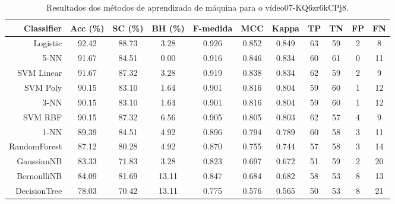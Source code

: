 \begin{table}[!htb]
\centering
\caption{Resultados dos métodos de aprendizado de máquina para o vídeo07-KQ6zr6kCPj8.}
\label{tab:07-KQ6zr6kCPj8}
\begin{tabular}{r|c|c|c|c|c|c|c|c|c|c}
\hline\hline
Classifier & Acc (\%) & SC (\%) & BH (\%) & F-medida & MCC & Kappa & TP & TN & FP & FN \\ \hline
Logistic & 92.42 & 88.73 & 3.28 & 0.926 & 0.852 & 0.849 & 63 & 59 & 2 & 8 \\ 
5-NN & 91.67 & 84.51 & 0.00 & 0.916 & 0.846 & 0.834 & 60 & 61 & 0 & 11 \\ 
SVM Linear & 91.67 & 87.32 & 3.28 & 0.919 & 0.838 & 0.834 & 62 & 59 & 2 & 9 \\ 
SVM Poly & 90.15 & 83.10 & 1.64 & 0.901 & 0.816 & 0.804 & 59 & 60 & 1 & 12 \\ 
3-NN & 90.15 & 83.10 & 1.64 & 0.901 & 0.816 & 0.804 & 59 & 60 & 1 & 12 \\ 
SVM RBF & 90.15 & 87.32 & 6.56 & 0.905 & 0.805 & 0.803 & 62 & 57 & 4 & 9 \\ 
1-NN & 89.39 & 84.51 & 4.92 & 0.896 & 0.794 & 0.789 & 60 & 58 & 3 & 11 \\ 
RandomForest & 87.12 & 80.28 & 4.92 & 0.870 & 0.755 & 0.744 & 57 & 58 & 3 & 14 \\ 
GaussianNB & 83.33 & 71.83 & 3.28 & 0.823 & 0.697 & 0.672 & 51 & 59 & 2 & 20 \\ 
BernoulliNB & 84.09 & 81.69 & 13.11 & 0.847 & 0.684 & 0.682 & 58 & 53 & 8 & 13 \\ 
DecisionTree & 78.03 & 70.42 & 13.11 & 0.775 & 0.576 & 0.565 & 50 & 53 & 8 & 21 \\ 
\hline\hline
\end{tabular}
\end{table}

